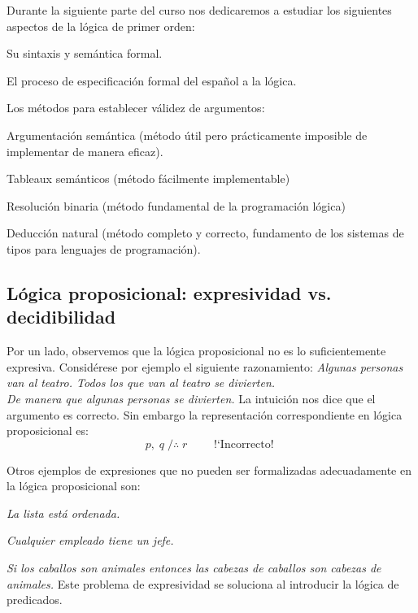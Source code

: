 \documentclass[11pt,letterpaper]{article}
\begin{document}
Durante la siguiente parte del curso nos dedicaremos a estudiar los siguientes 
aspectos de la lógica de primer orden:

\bi
\item Su sintaxis y semántica formal.
\item El proceso de especificación formal del español a la lógica.
\item Los métodos para establecer válidez de argumentos:
\be
\item Argumentación semántica  (método \'util pero prácticamente imposible de
  implementar de manera eficaz).
\item Tableaux semánticos (método fácilmente implementable)
\item Resolución binaria (método fundamental de la programación lógica)
\item Deducción natural (método completo y correcto, fundamento de los
  sistemas de tipos para lenguajes de programación).
\ee
\ei


\subsection{Lógica proposicional: expresividad vs. decidibilidad}

Por un lado, observemos que la lógica proposicional no es lo suficientemente 
expresiva. 
Considérese por ejemplo el siguiente razonamiento:
\bc
\emph{Algunas personas van al teatro. Todos los que van al teatro se
divierten. \\ De manera que algunas personas se divierten.}
\ec
La intuición nos dice que el argumento es correcto. Sin embargo la 
representación correspondiente en lógica proposicional es:
$$ p,\;q\;/\therefore\;r\qquad \text{ !`Incorrecto! } $$

\espc

Otros ejemplos de expresiones que no pueden ser formalizadas adecuadamente en
la lógica proposicional son:
\bi
\item[] \emph{La lista está ordenada.}
\item[] \emph{Cualquier empleado tiene un jefe.}
\item[] \emph{Si los caballos son animales entonces las cabezas de caballos son
  cabezas de animales.}
\ei
Este problema de expresividad se soluciona al introducir la lógica de 
predicados.
\end{document}
